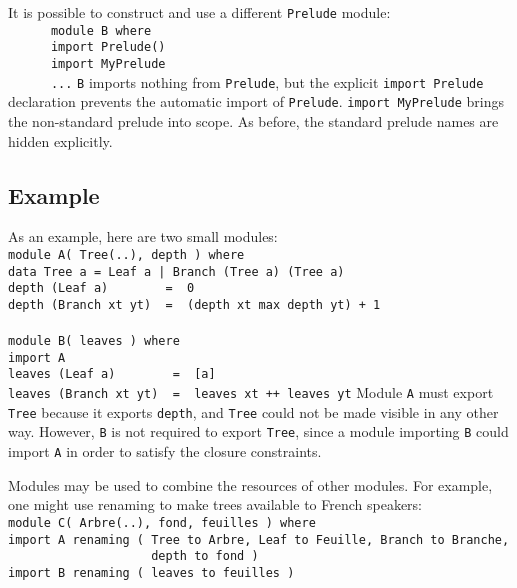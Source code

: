 It is possible to construct and use a different \mbox{\tt Prelude} module:
\bprog
\mbox{\tt \ \ \ \ \ \ module\ B\ where}\\
\mbox{\tt \ \ \ \ \ \ import\ Prelude()}\\
\mbox{\tt \ \ \ \ \ \ import\ MyPrelude}\\
\mbox{\tt \ \ \ \ \ \ ...}
\eprog
\mbox{\tt B} imports nothing from \mbox{\tt Prelude}, but the
explicit \mbox{\tt import\ Prelude} declaration prevents the automatic import of
\mbox{\tt Prelude}.  \mbox{\tt import\ MyPrelude} brings the
non-standard prelude into scope.  As before, the
standard prelude names are hidden explicitly.


\subsection{Example}

As an example, here are two small modules:\nopagebreak
\bprog
\mbox{\tt module\ A(\ Tree(..),\ depth\ )\ where}\\
\mbox{\tt data\ Tree\ a\ =\ Leaf\ a\ |\ Branch\ (Tree\ a)\ (Tree\ a)}\\
\mbox{\tt depth\ (Leaf\ a)\ \ \ \ \ \ \ \ =\ \ 0}\\
\mbox{\tt depth\ (Branch\ xt\ yt)\ \ =\ \ (depth\ xt\ }\bkqB\mbox{\tt max}\bkqA\mbox{\tt \ depth\ yt)\ +\ 1}\\
\mbox{\tt }\\[-8pt]
\mbox{\tt module\ B(\ leaves\ )\ where}\\
\mbox{\tt import\ A}\\
\mbox{\tt leaves\ (Leaf\ a)\ \ \ \ \ \ \ \ =\ \ [a]}\\
\mbox{\tt leaves\ (Branch\ xt\ yt)\ \ =\ \ leaves\ xt\ ++\ leaves\ yt}
\eprog
Module \mbox{\tt A} must export \mbox{\tt Tree} because it exports \mbox{\tt depth}, and \mbox{\tt Tree}
could not be made visible in any other way.  However, \mbox{\tt B} is not
required to export \mbox{\tt Tree}, since a module importing \mbox{\tt B} could import
\mbox{\tt A} in order to satisfy the closure constraints.

Modules may be used to combine the resources of other modules.  For
example, one might use renaming to make trees available to
French speakers:
\bprog
\mbox{\tt module\ C(\ Arbre(..),\ fond,\ feuilles\ )\ where}\\
\mbox{\tt import\ A\ renaming\ (\ Tree\ to\ Arbre,\ Leaf\ to\ Feuille,\ Branch\ to\ Branche,}\\
\mbox{\tt \ \ \ \ \ \ \ \ \ \ \ \ \ \ \ \ \ \ \ \ depth\ to\ fond\ )}\\
\mbox{\tt import\ B\ renaming\ (\ leaves\ to\ feuilles\ )}
\eprogNoSkip

